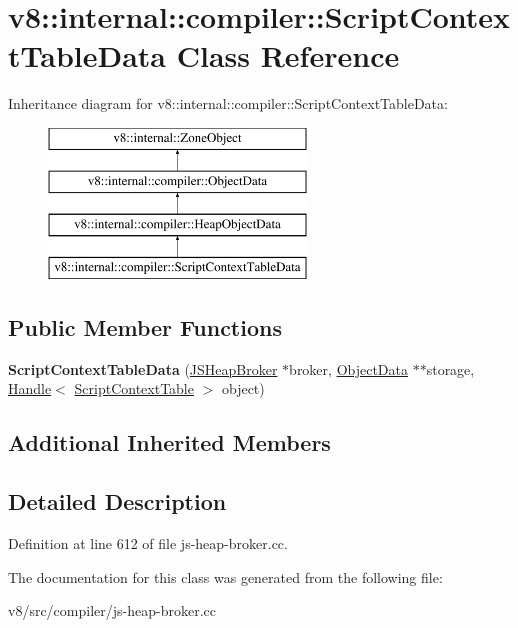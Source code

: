 \hypertarget{classv8_1_1internal_1_1compiler_1_1ScriptContextTableData}{}\section{v8\+:\+:internal\+:\+:compiler\+:\+:Script\+Context\+Table\+Data Class Reference}
\label{classv8_1_1internal_1_1compiler_1_1ScriptContextTableData}
Inheritance diagram for v8\+:\+:internal\+:\+:compiler\+:\+:Script\+Context\+Table\+Data\+:\begin{figure}[H]
\begin{center}
\leavevmode
\includegraphics[height=4.000000cm]{classv8_1_1internal_1_1compiler_1_1ScriptContextTableData}
\end{center}
\end{figure}
\subsection*{Public Member Functions}
\begin{DoxyCompactItemize}
\item 
\mbox{\label{classv8_1_1internal_1_1compiler_1_1ScriptContextTableData_a6caf39d533bcd467bb9faa4a0708ca59}} 
{\bfseries Script\+Context\+Table\+Data} (\mbox{\hyperlink{classv8_1_1internal_1_1compiler_1_1JSHeapBroker}{J\+S\+Heap\+Broker}} $\ast$broker, \mbox{\hyperlink{classv8_1_1internal_1_1compiler_1_1ObjectData}{Object\+Data}} $\ast$$\ast$storage, \mbox{\hyperlink{classv8_1_1internal_1_1Handle}{Handle}}$<$ \mbox{\hyperlink{classv8_1_1internal_1_1ScriptContextTable}{Script\+Context\+Table}} $>$ object)
\end{DoxyCompactItemize}
\subsection*{Additional Inherited Members}


\subsection{Detailed Description}


Definition at line 612 of file js-\/heap-\/broker.\+cc.



The documentation for this class was generated from the following file\+:\begin{DoxyCompactItemize}
\item 
v8/src/compiler/js-\/heap-\/broker.\+cc\end{DoxyCompactItemize}
